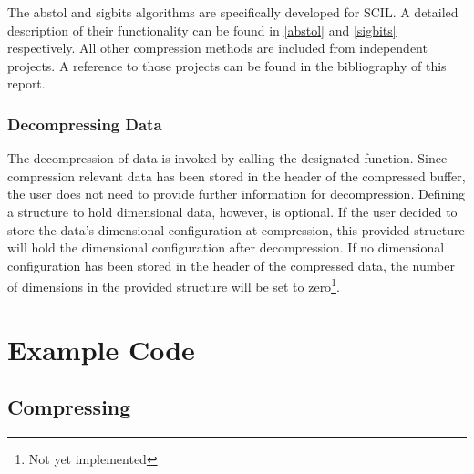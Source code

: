 \documentclass[
	12pt,
	a4paper,
	BCOR10mm,
	DIV14,
	headsepline,
]{scrreprt}
\begin{document}
\setcounter{footnote}{0}

\bigskip

The abstol and sigbits algorithms are specifically developed for SCIL. A
detailed description of their functionality can be found in \cref{abstol} and
\cref{sigbits} respectively. All other compression methods are included from
independent projects. A reference to those projects can be found in the
bibliography of this report.

\clearpage

\subsection{Decompressing Data}

\bigskip

The decompression of data is invoked by calling the designated function. Since
compression relevant data has been stored in the header of the compressed
buffer, the user does not need to provide further information for decompression.
Defining a structure to hold dimensional data, however, is optional. If the user
decided to store the data's dimensional configuration at compression, this
provided structure will hold the dimensional configuration after decompression.
If no dimensional configuration has been stored in the header of the compressed
data, the number of dimensions in the provided structure will be set to
zero\footnote{Not yet implemented}.

\setcounter{footnote}{0}

\chapter{Example Code}


\section{Compressing}

\bigskip
\end{document}
